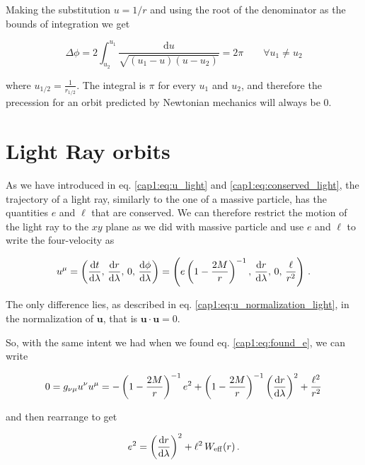 Making the substitution $u = 1 / r$ and using the root of the denominator as
the bounds of integration we get

\begin{equation}
    \Delta \phi
    = 2 \int_{u_2}^{u_1} \frac{\mathrm{d} u}{\sqrt{(u_1 - u)(u - u_2)}} 
    = 2 \pi \quad \quad \forall u_1 \neq u_2
\end{equation}

where $u_{1/2} = \frac{1}{r_{1/2}}$.
The integral is $\pi$ for every $u_1$ and $u_2$, and therefore the precession
for an orbit predicted by Newtonian mechanics will always be $0$.


\newpage


\section{Light Ray orbits}

As we have introduced in eq. \ref{cap1:eq:u_light} and
\ref{cap1:eq:conserved_light}, the trajectory of a light ray, similarly to the
one of a massive particle, has the quantities $e$ and $\ell$ that are conserved.
We can therefore restrict the motion of the light ray to the $xy$ plane as we
did with massive particle and use $e$ and $\ell$ to write the four-velocity as

\begin{equation*}
    u^\mu
    = \left(\dv{t}{\lambda}, \, \dv{r}{\lambda}, \,
    0, \, \dv{\phi}{\lambda} \right)
    = \left( e \left(1 - \frac{2M}{r} \right)^{-1}, \, \dv{r}{\lambda}, \,
    0, \, \frac{\ell}{r^2} \right) \, .
\end{equation*}

The only difference lies, as described in eq.
\ref{cap1:eq:u_normalization_light}, in the normalization of $\mathbf u$, that
is $\mathbf{u \cdot u} = 0$.

So, with the same intent we had when we found eq. \ref{cap1:eq:found_e}, we can
write

\begin{equation*}
    0 = g_{\nu \mu} u^\nu u^\mu =
    - \left(1 - \frac{2M}{r} \right)^{-1} e^2
    + \left(1 - \frac{2M}{r} \right)^{- 1} \left(\dv{r}{\lambda} \right)^2
    + \frac{\ell^2}{r^2}
\end{equation*}

and then rearrange to get

\begin{equation}
    e^2 = \left( \dv{r}{\lambda} \right)^2 + \ell^2 \, W_{\rm eff} (r) \, .
    \label{cap1:eq:found_e_massless}
\end{equation}

